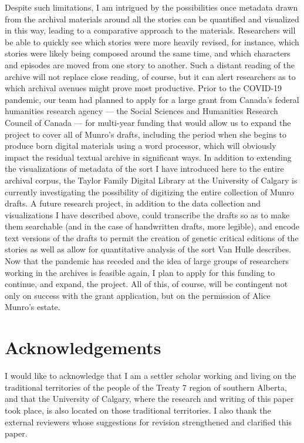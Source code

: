 \begin{paper}
Despite such limitations, I am intrigued by the possibilities once
metadata drawn from the archival materials around all the stories can be
quantified and visualized in this way, leading to a comparative approach
to the materials. Researchers will be able to quickly see which stories
were more heavily revised, for instance, which stories were likely being
composed around the same time, and which characters and episodes are
moved from one story to another. Such a distant reading of the archive
will not replace close reading, of course, but it can alert researchers
as to which archival avenues might prove most productive. Prior to the
COVID-19 pandemic, our team had planned to apply for a large grant from
Canada's federal humanities research agency –– the Social Sciences and
Humanities Research Council of Canada –– for multi-year funding that
would allow us to expand the project to cover all of Munro's drafts,
including the period when she begins to produce born digital materials
using a word processor, which will obviously impact the residual textual
archive in significant ways. In addition to extending the visualizations
of metadata of the sort I have introduced here to the entire archival
corpus, the Taylor Family Digital Library at the University of Calgary
is currently investigating the possibility of digitizing the entire
collection of Munro drafts. A future research project, in addition to
the data collection and visualizations I have described above, could
transcribe the drafts so as to make them searchable (and in the case of
handwritten drafts, more legible), and encode text versions of the
drafts to permit the creation of genetic critical editions of the
stories as well as allow for quantitative analysis of the sort Van Hulle
describes. Now that the pandemic has receded and the idea of
large groups of researchers working in the archives is feasible again, I
plan to apply for this funding to continue, and expand, the project. All
of this, of course, will be contingent not only on success with the
grant application, but on the permission of Alice Munro’s estate.

\section*{Acknowledgements}
I would
  like to acknowledge that I am a settler scholar working and living on
  the traditional territories of the people of the Treaty 7 region of
  southern Alberta, and that the University of Calgary, where the
  research and writing of this paper took place, is also located on
  those traditional territories. I also thank the external reviewers
  whose suggestions for revision strengthened and clarified this paper.

\begin{flushleft}
    \renewcommand*{\mkbibnamefamily}[1]{\textsc{#1}}
    \renewcommand*{\mkbibnamegiven}[1]{\textsc{#1}} 
\printbibliography
\end{flushleft}

\end{paper}